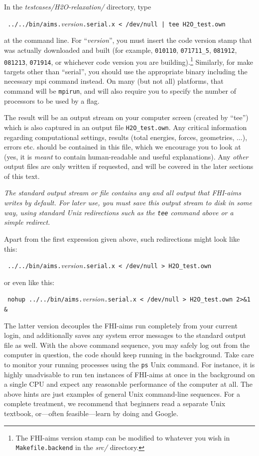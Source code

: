 In the \emph{testcases/H2O-relaxation/} directory, type

{
  \verb+ ../../bin/aims.+\emph{version}\verb+.serial.x < /dev/null | tee H2O_test.own+
}

at the command line. For ``\emph{version}'', you must insert the code version stamp 
that was actually downloaded and built (for example, \verb+010110+, \verb+071711_5+, \verb+081912+, 
\verb+081213+, \verb+071914+, or whichever code version you are building).\footnote{The 
FHI-aims version stamp can be modified to whatever you wish in \texttt{Makefile.backend} in the \emph{src/} directory.}
Similarly, for make targets other than ``serial'', you should
use the appropriate binary including the necessary mpi command
instead. On many (but not all) platforms, that command will be
\texttt{mpirun}, and will also require you to specify the number of processors
to be used by a flag. 

The result will be an output stream on your computer screen (created by
``tee'') which is also captured in an output file \texttt{H2O\_test.own}. 
Any critical information regarding computational
settings, results (total energies, forces, geometries, ...), errors
etc. should be contained in this file, which we encourage you to look at (yes,
it is \emph{meant} to contain human-readable and useful explanations). Any \emph{other} output files are  
only written if requested, and will be covered in the later sections of this
text.

\begin{center}
  \parbox[c]{0.8\textwidth}
  {
  \emph{The standard output stream or file contains any and all output that FHI-aims
  writes by default. For later use, you must save this output stream to disk in some way, 
  using standard Unix redirections such as the \texttt{tee} command above or a simple 
  redirect.}
  }
\end{center}

  Apart from the first expression given above, such 
  redirections might look like this: 

  {
    \verb+ ../../bin/aims.+\emph{version}\verb+.serial.x < /dev/null > H2O_test.own+
  }

  or even like this: 

  {
    \verb+ nohup ../../bin/aims.+\emph{version}\verb+.serial.x < /dev/null > H2O_test.own 2>&1 &+
  }

  The latter version decouples the FHI-aims run completely from your current login, and additionally
  saves any system error messages to the standard output file as well. With the above command sequence,
  you may safely log out from the computer in question, the code should keep running in the background. 
  Take care to monitor your running processes using the \texttt{ps} Unix command. For instance, it is
  highly unadvisable to run ten instances of FHI-aims at once in the background on a single CPU and expect
  any reasonable performance of the computer at all. The above hints
  are just examples of general Unix command-line sequences. For a complete treatment, we
  recommend that beginners read a separate Unix textbook, or---often feasible---learn by doing and Google. 

